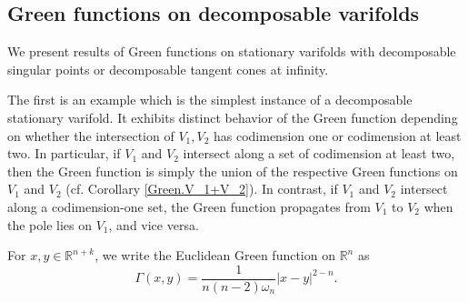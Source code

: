 \documentclass[11pt]{amsart}
\theoremstyle{definition}
\newcommand{\R}{\mathbb{R}}
\begin{document}
\subsection{Green functions on decomposable varifolds}
We present results of Green functions on stationary varifolds with decomposable singular points or decomposable tangent cones at infinity.

The first is an example which is the simplest instance of a decomposable stationary varifold. It exhibits distinct behavior of the Green function depending on whether the intersection of $V_1,V_2$ has codimension one or codimension at least two. In particular, if $V_1$ and $V_2$ intersect along a set of codimension at least two, then the Green function is simply the union of the respective Green functions on $V_1$ and $V_2$ (cf. Corollary \ref{Green.V_1+V_2}). In contrast, if $V_1$ and $V_2$ intersect along a codimension-one set, the Green function propagates from $V_1$ to $V_2$ when the pole lies on $V_1$, and vice versa. 

For $x,y\in \R^{n+k}$, we write the Euclidean Green function on $\R^n$ as
\[\Gamma(x,y)=\frac{1}{n(n-2)\omega_n}|x-y|^{2-n}.\]
\end{document}
